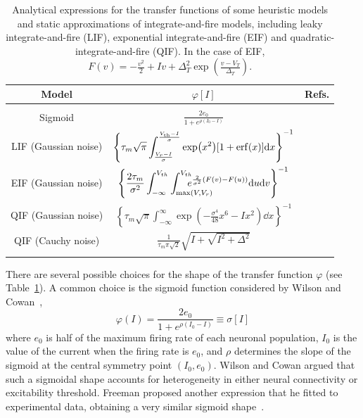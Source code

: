 \documentclass[12pt]{article}
\numberwithin{equation}{section}
\begin{document}
\begin{table}\label{table1} \small
\centering
\begingroup
{}              %
\setlength{\arrayrulewidth}{0.4pt}  %
\begin{tabular}{|c|c|c|} \hline
  \rowcolor{softblue!25}
  \textbf{\color{softblue!60!black} Model} &
  \textbf{\color{softblue!60!black} $\varphi[I]$} &
  \textbf{\color{softblue!60!black} Refs.} \\
  \hline
  & & \\  %
  Sigmoid & $\displaystyle{\frac{2e_0}{1+e^{\rho(I_0-I)}}}$ & \cite{wilson1972,jansen1995}\\[15pt]
  LIF (Gaussian noise) & $\left\{\displaystyle{\tau_m\sqrt{\pi} \int_\frac{V_r-I}{\sigma}^\frac{V_\text{th}-I}{\sigma} \exp(x^2)[1+\erf(x)]\dd x}\right\}^{-1}$ & \cite{siegert1951,amit1997,brunel1999} \\[15pt]
  EIF (Gaussian noise) & $\displaystyle{\left\{\frac{2\tau_m}{\sigma^2}\int_{-\infty}^{V_{th}}
  \int_{\max(V,V_r)}^{V_{th}}\mkern-32mu\mkern-18mu e^{\frac{2}{\sigma^2}(F(v)-F(u))}
  \dd u \dd v \right\}^{-1} }$ & \cite{fourcaud-trocme2003,fourcaud-trocm2005} \\[15pt]
  QIF (Gaussian noise) & $\displaystyle{\left\{\tau_m\sqrt{\pi} \int_{-\infty}^\infty \exp\left(-\frac{\sigma^4}{48}x^6 - Ix^2 \right) \dd x\right\}^{-1}}$ & \cite{brunel2003a} \\[15pt]
  QIF (Cauchy noise) & $\displaystyle{\frac{1}{\tau_m\pi\sqrt{2}}}\sqrt{I+\sqrt{I^2+\Delta^2}}$ & \cite{montbrio2015,clusella2022a} \\
  & & \\ %
  \hline
\end{tabular}
\endgroup
\caption{Analytical expressions for the transfer functions of some heuristic models and 
static approximations of integrate-and-fire models, including leaky integrate-and-fire (LIF), exponential integrate-and-fire (EIF) and quadratic-integrate-and-fire (QIF). In the case
of EIF, $F(v) = -\frac{v^2}{2} + Iv + \Delta_T^2\exp\left(\frac{v-V_T}{\Delta_T}\right)$.
} \label{table:transfers}
\end{table}


There are several possible choices for the shape
of the transfer function $\varphi$ (see Table~\ref{table:transfers}). 
A common choice is the sigmoid function considered by Wilson and Cowan~\cite{wilson1972},
\begin{equation}\label{eq:sigmoid}
\varphi(I) = \frac{2e_0}{1+e^{\rho(I_0-I)}} \equiv \sigma [I] 
\end{equation}
where $e_0$ is half of the maximum firing rate of each neuronal population, $I_0$ is the value of the current when the firing rate is $e_0$, and $\rho$ determines the slope of the sigmoid at the central symmetry point $(I_0, e_0)$.
Wilson and Cowan argued that such a sigmoidal shape accounts for heterogeneity in either neural connectivity
or excitability threshold.
Freeman proposed another expression that he fitted to experimental data,
obtaining a very similar sigmoid shape~\cite{freeman1975,freeman1979}.
\end{document}

